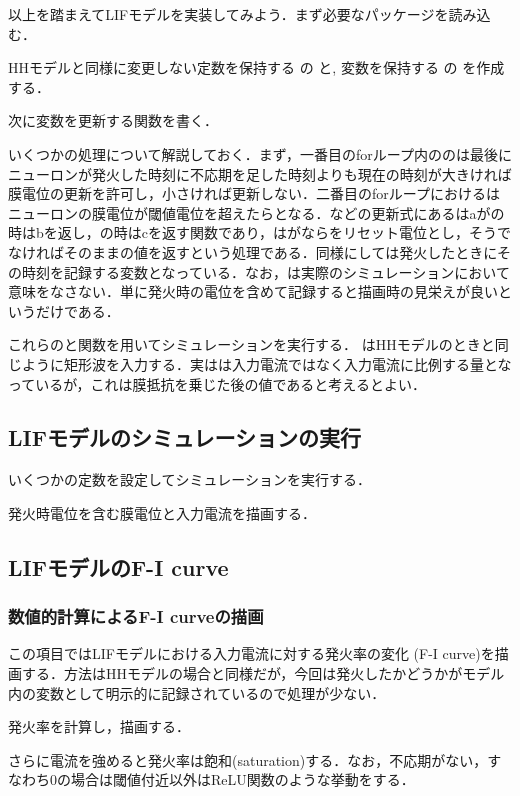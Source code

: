 以上を踏まえてLIFモデルを実装してみよう．まず必要なパッケージを読み込む．

HHモデルと同様に変更しない定数を保持する  の  と, 変数を保持する  の  を作成する．

次に変数を更新する関数を書く．

いくつかの処理について解説しておく．まず，一番目のforループ内ののは最後にニューロンが発火した時刻に不応期を足した時刻よりも現在の時刻が大きければ膜電位の更新を許可し，小さければ更新しない．二番目のforループにおけるはニューロンの膜電位が閾値電位を超えたらとなる．などの更新式にあるはaがの時はbを返し，の時はcを返す関数であり，はがならをリセット電位とし，そうでなければそのままの値を返すという処理である．同様にしては発火したときにその時刻を記録する変数となっている．なお，は実際のシミュレーションにおいて意味をなさない．単に発火時の電位を含めて記録すると描画時の見栄えが良いというだけである．

これらのと関数を用いてシミュレーションを実行する． はHHモデルのときと同じように矩形波を入力する．実はは入力電流ではなく入力電流に比例する量となっているが，これは膜抵抗を乗じた後の値であると考えるとよい．
\subsection{LIFモデルのシミュレーションの実行}
いくつかの定数を設定してシミュレーションを実行する．

発火時電位を含む膜電位と入力電流を描画する．


\subsection{LIFモデルのF-I curve}
\subsubsection{数値的計算によるF-I curveの描画}
この項目ではLIFモデルにおける入力電流に対する発火率の変化 (F-I curve)を描画する．方法はHHモデルの場合と同様だが，今回は発火したかどうかがモデル内の変数として明示的に記録されているので処理が少ない．

発火率を計算し，描画する．



さらに電流を強めると発火率は飽和(saturation)する．なお，不応期がない，すなわち0の場合は閾値付近以外はReLU関数のような挙動をする．
